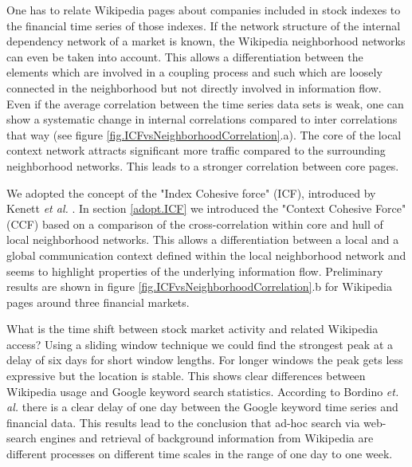 \documentclass[a4paper,10pt]{scrbook}
\begin{document}
One has to relate Wikipedia pages about companies included in stock indexes to the financial time series of those indexes. If the network structure of the internal dependency network of a market is known, the Wikipedia neighborhood networks can even be taken into account. This allows a differentiation between the elements which are involved in a coupling process and such which are loosely connected in the neighborhood but not directly involved in information flow. Even if the average correlation between the time series data sets is weak, one can show a systematic change in internal correlations compared to inter correlations that way (see figure \ref{fig.ICFvsNeighborhoodCorrelation}.a). The core of the local context network attracts significant more traffic compared to the surrounding neighborhood networks. This leads to a stronger correlation between core pages. 

We adopted the concept of the "Index Cohesive force" (ICF), introduced by Kenett \textit{et al.} \cite{Kenett2012}. In section \ref{adopt.ICF} we introduced the "Context Cohesive Force" (CCF) based on a comparison of the cross-correlation within core and hull of local neighborhood networks. This allows a differentiation between a local and a global communication context defined within the local neighborhood network and seems to highlight properties of the underlying information flow. Preliminary results are shown in figure \ref{fig.ICFvsNeighborhoodCorrelation}.b for Wikipedia pages around three financial markets. 

What is the time shift between stock market activity and related Wikipedia access? Using a sliding window technique we could find the strongest peak at a delay of six days for short window lengths. For longer windows the peak gets less expressive but the location is stable. This shows clear differences between Wikipedia usage and Google keyword search statistics. According to Bordino \textit{et. al.} \cite{Bordino2012} there is a clear delay of one day between the Google keyword time series and financial data. This results lead to the conclusion that ad-hoc search via web-search engines and retrieval of background information from Wikipedia are different processes on different time scales in the range of one day to one week. 
\end{document}
